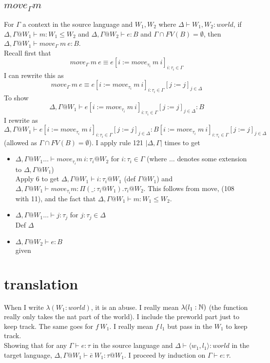 \message{ !name(paper.tex)}\documentclass{article}
\begin{document}
\subsection*{$move_{\Gamma} m$}
For $\Gamma$ a context in the source language and $W_1, W_2$ where $\Delta \vdash W_1, W_2 : world$, if  $\Delta, \Gamma@W_1 \vdash m: W_1 \leq W_2$ and $\Delta, \Gamma@W_2 \vdash e : B$ and 
$\Gamma \cap FV(B) = \emptyset$,
then $\Delta, \Gamma @ W_1 \vdash move_{\Gamma} \:m \:e : B$.\\
Recall first that \[move_{\Gamma} \:m \:e \equiv
e[i := move_{\tau_i} \: m\: i]_{i: \tau_i \in \Gamma}
\]
I can rewrite this as 
\[move_{\Gamma} \:m \:e \equiv
e[i := move_{\tau_i} \: m\: i]_{i: \tau_i \in \Gamma}[j := j]_{j \in \Delta}
\]
To show
\[\Delta, \Gamma @ W_1 \vdash e[i := move_{\tau_i} \: m\: i]_{i: \tau_i \in \Gamma}[j := j]_{j \in \Delta} : B\]
I rewrite as
\[\Delta, \Gamma @ W_1 \vdash e[i := move_{\tau_i} \: m\: i]_{i: \tau_i \in \Gamma}[j := j]_{j \in \Delta} : B[i := move_{\tau_i} \: m\: i]_{i: \tau_i \in \Gamma}[j := j]_{j \in \Delta}\]
(allowed as $\Gamma \cap FV(B) = \emptyset$).
I apply rule 121 $|\Delta, \Gamma|$ times to get
\begin{itemize}
    \item $\Delta, \Gamma@W_1 \dots \vdash move_{\tau_i} m\:i : \tau_i @ W_2$ for $i: \tau_i \in \Gamma$
    (where $\dots$ denotes some extension to $\Delta, \Gamma@W_1$)\\
    Apply 6 to get $\Delta, \Gamma@W_1  \vdash i: \tau_i @ W_1$ (def $\Gamma@W_1$) and $\Delta, \Gamma@W_1  \vdash move_{\tau_i} m : \Pi(\_ : \tau_i@W_1).\tau_i @ W_2$. This follows from move, (108 with 11), and the fact that  $\Delta, \Gamma@W_1 \vdash m: W_1 \leq W_2$.
    \item $\Delta, \Gamma@W_1 \dots \vdash j : \tau_j$ for $j : \tau_j \in \Delta$\\
    Def $\Delta$
    \item $\Delta, \Gamma@W_2 \vdash e: B$\\
    given
\end{itemize}

\section*{translation}
When I write $\lambda (W_1: world)$, it is an abuse. I really mean $\lambda (l_1: \mathbb{N})$ (the function really only takes the nat part of the world). I include the preworld part just to keep track. The same goes for $f \: W_1$. I really mean $f \: l_1$ but pass in the $W_1$ to keep track.\\
Showing that for any $\Gamma \vdash e : \tau$ in the source language and $\Delta \vdash  \langle w_1, l_1 \rangle : world$ in the target language,
$\Delta, \Gamma @ W_1 \vdash \bar{e}\: W_1 : \tau @ W_1$. I proceed by induction on $\Gamma \vdash e : \tau$.\\
\end{document}
